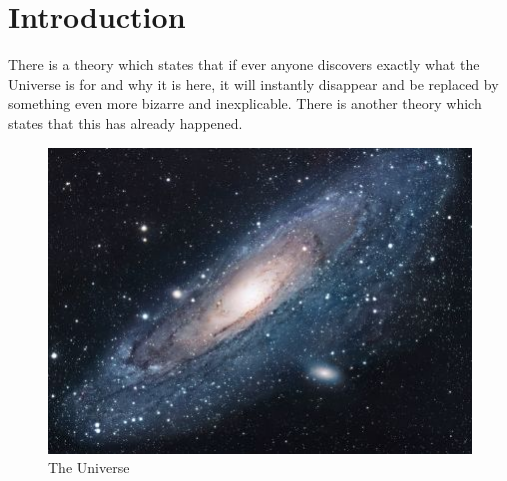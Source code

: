 \chapter{Introduction}
There is a theory which states that if ever anyone discovers exactly what the Universe is for and why it is here, it will instantly disappear and be replaced by something even more bizarre and inexplicable.
There is another theory which states that this has already happened.
\begin{figure}[h!]
\centering
\includegraphics[scale=1.7]{res/universe.jpg}
\caption{The Universe}
\label{fig:universe}
\end{figure}

\pagebreak
